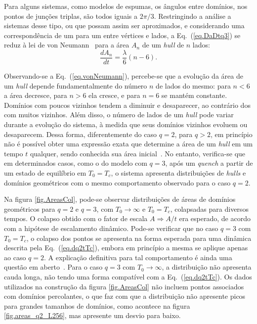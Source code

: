 Para alguns sistemas, como modelos de espumas, os ângulos entre domínios, nos pontos de junções triplas, são todos iguais a $2\pi/3$. Restringindo a análise a sistemas desse tipo, ou que possam assim ser aproximados, e considerando uma correspondência de um para um entre vértices e lados, a Eq.~(\ref{eq.DaDtq3}) se reduz à lei de von Neumann~\cite{Neumann1952,Mullins1956} para a área $A_n$ de um \textit{hull} de $n$ lados:
\begin{equation}
 \label{eq.vonNeumann}
 \frac{dA_n}{dt} = \frac{\lambda}{6} \left( n-6 \right).
\end{equation}

Observando-se a Eq.~(\ref{eq.vonNeumann}), percebe-se que a evolução da área de um \textit{hull} depende fundamentalmente do número $n$ de lados do mesmo: para $n<6$ a área decresce, para $n>6$ ela cresce, e para $n=6$ se mantém constante. Domínios com poucos vizinhos tendem a diminuir e desaparecer, ao contrário dos com muitos vizinhos. Além disso, o número de lados de um \textit{hull} pode variar durante a evolução do sistema, à medida que seus domínios vizinhos evoluem ou desaparecem. Dessa forma, diferentemente do caso $q=2$, para $q>2$, em princípio não é possível obter uma expressão exata que determine a área de um \textit{hull} em um tempo $t$ qualquer, sendo conhecida sua área inicial~\cite{LoureiroPRE,LoureiroPRE2012}. No entanto, verifica-se que em determinados casos, como o do modelo com $q=3$, após um \textit{quench} a partir de um estado de equilíbrio em $T_0=T_c$, o sistema apresenta distribuições de \textit{hulls} e domínios geométricos com o mesmo comportamento observado para o caso $q=2$.

Na figura \ref{fig.AreasCol}, pode-se observar distribuições de áreas de domínios geométricos para $q=2$ e $q=3$, com $T_0 \rightarrow \infty$ e $T_0=T_c$, colapsadas para diversos tempos. O colapso obtido com o fator de escala $A \Rightarrow A/t$ era esperado, de acordo com a hipótese de escalamento dinâmico. Pode-se verificar que no caso $q=3$ com $T_0=T_c$, o colapso dos pontos se apresenta na forma esperada para uma dinâmica descrita pela Eq.~(\ref{eq.dq2tTc}), embora em princípio a mesma se aplique apenas ao caso $q=2$. A explicação definitiva para tal comportamento é ainda uma questão em aberto~\cite{LoureiroPRE}. Para o caso $q=3$ com $T_0 \rightarrow \infty$, a distribuição não apresenta cauda longa, não tendo uma forma compatível com a Eq.~(\ref{eq.dq2tTc}). Os dados utilizados na construção da figura \ref{fig.AreasCol} não incluem pontos associados com domínios percolantes, o que faz com que a distribuição não apresente picos para grandes tamanhos de domínios, como acontece na figura \ref{fig.areas_q2_L256}, mas apresente um desvio para baixo.

